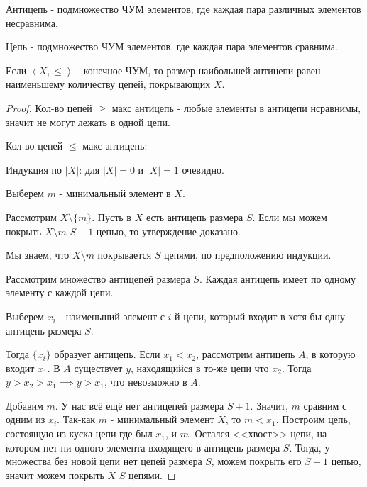 \begin{theorem} \thmslashn

    \TODO
\end{theorem}
\begin{definition} \thmslashn 

    Антицепь - подмножество ЧУМ элементов, где каждая пара различных элементов несравнима.
\end{definition}
\begin{definition} \thmslashn 

    Цепь - подмножество ЧУМ элементов, где каждая пара элементов сравнима.
\end{definition}
\begin{theorem} \thmslashn

    Если $\left<X, \le \right>$ - конечное ЧУМ, то размер наибольшей антицепи равен наименьшему количеству цепей, покрывающих $X$.
    \begin{proof} \thmslashn
    
       Кол-во цепей $\ge $ макс антицепь - любые элементы в антицепи нсравнимы, значит не могут лежать в одной цепи.

       Кол-во цепей $\le $ макс антицепь:

       Индукция по $|X|$: для $|X| = 0$ и $|X| =1$ очевидно.

       Выберем $m$ - минимальный элемент в $X$.

       Рассмотрим $X \setminus \{m\} $. Пусть в $X$ есть антицепь размера $S$. Если мы можем покрыть $X \setminus m$ $S - 1$ цепью, то утверждение доказано. 

       Мы знаем, что $X \setminus m$ покрывается $S$ цепями, по предположению индукции.

       Рассмотрим множество антицепей размера $S$. Каждая антицепь имеет по одному элементу с каждой цепи.

       Выберем $x_{i}$ - наименьший элемент с $i$-й цепи, который входит в хотя-бы одну антицепь размера $S$.

       Тогда $\{x_{i}\} $ образует антицепь. Если $x_1 < x_2$, рассмотрим антицепь $A$, в которую входит $x_1$. В $A$ существует $y$, находящийся в то-же цепи что $x_2$. Тогда $y > x_2 > x_1 \implies y > x_1$, что невозможно в $A$.

        Добавим $m$.  У нас всё ещё нет антицепей размера $S + 1$. Значит,  $m$ сравним с одним из  $x_{i}$. Так-как $m$ - минимальный элемент  $X$, то  $m < x_1$. Построим цепь, состоящую из куска цепи где был $x_1$, и $m$. Остался <<хвост>> цепи, на котором нет ни одного элемента входящего в антицепь размера  $S$. Тогда, у множества без новой цепи нет цепей размера  $S$, можем покрыть его  $S-1$ цепью, значит можем покрыть  $X$  $S$ цепями. 
   \end{proof}
\end{theorem}
